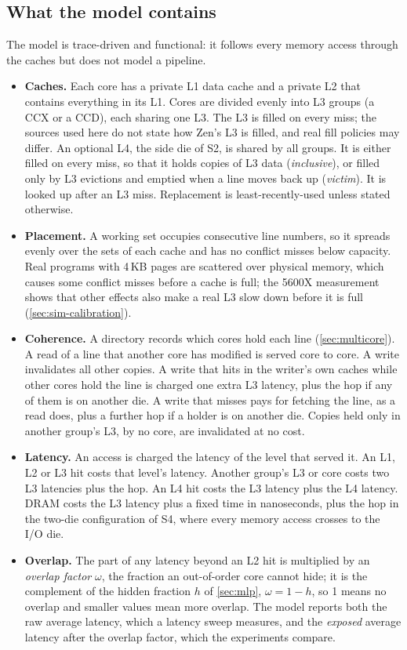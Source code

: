 \subsection*{What the model contains}
The model is trace-driven and functional: it follows every memory access through the caches but does not model a pipeline.
\begin{itemize}
  \item \textbf{Caches.} Each core has a private L1 data cache and a private L2 that contains everything in its L1. Cores are divided evenly into L3 groups (a CCX or a CCD), each sharing one L3. The L3 is filled on every miss; the sources used here do not state how Zen's L3 is filled, and real fill policies may differ. An optional L4, the side die of S2, is shared by all groups. It is either filled on every miss, so that it holds copies of L3 data (\emph{inclusive}), or filled only by L3 evictions and emptied when a line moves back up (\emph{victim}). It is looked up after an L3 miss. Replacement is least-recently-used unless stated otherwise.
  \item \textbf{Placement.} A working set occupies consecutive line numbers, so it spreads evenly over the sets of each cache and has no conflict misses below capacity. Real programs with 4\,KB pages are scattered over physical memory, which causes some conflict misses before a cache is full; the 5600X measurement shows that other effects also make a real L3 slow down before it is full (\cref{sec:sim-calibration}).
  \item \textbf{Coherence.} A directory records which cores hold each line (\cref{sec:multicore}). A read of a line that another core has modified is served core to core. A write invalidates all other copies. A write that hits in the writer's own caches while other cores hold the line is charged one extra L3 latency, plus the hop if any of them is on another die. A write that misses pays for fetching the line, as a read does, plus a further hop if a holder is on another die. Copies held only in another group's L3, by no core, are invalidated at no cost.
  \item \textbf{Latency.} An access is charged the latency of the level that served it. An L1, L2 or L3 hit costs that level's latency. Another group's L3 or core costs two L3 latencies plus the hop. An L4 hit costs the L3 latency plus the L4 latency. DRAM costs the L3 latency plus a fixed time in nanoseconds, plus the hop in the two-die configuration of S4, where every memory access crosses to the I/O die.
  \item \textbf{Overlap.} The part of any latency beyond an L2 hit is multiplied by an \emph{overlap factor} $\omega$, the fraction an out-of-order core cannot hide; it is the complement of the hidden fraction $h$ of \cref{sec:mlp}, $\omega = 1 - h$, so 1 means no overlap and smaller values mean more overlap. The model reports both the raw average latency, which a latency sweep measures, and the \emph{exposed} average latency after the overlap factor, which the experiments compare.

\end{itemize}

